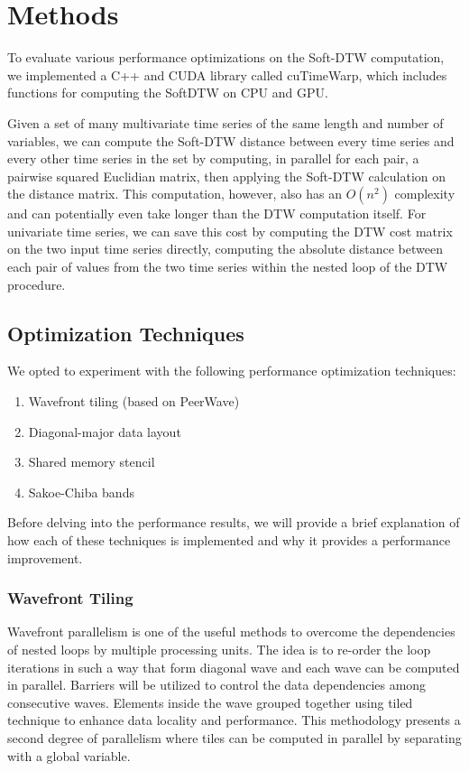 \documentclass[12pt, letterpaper]{article}
\begin{document}
\section{Methods}

To evaluate various performance optimizations on the Soft-DTW computation, we
implemented a C++ and CUDA library called cuTimeWarp, which includes functions
for computing the SoftDTW on CPU and GPU.

Given a set of many multivariate time series of the same length and number of
variables, we can compute the Soft-DTW distance between every time series and
every other time series in the set by computing, in parallel for each pair, a
pairwise squared Euclidian matrix, then applying the Soft-DTW calculation on the
distance matrix. This computation, however, also has an $O(n^2)$ complexity and
can potentially even take longer than the DTW computation itself. For univariate
time series, we can save this cost by computing the DTW cost matrix on the two
input time series directly, computing the absolute distance between each pair of
values from the two time series within the nested loop of the DTW procedure.

\subsection{Optimization Techniques}

We opted to experiment with the following performance optimization techniques:

\begin{enumerate}
\item Wavefront tiling (based on PeerWave)
\item Diagonal-major data layout
\item Shared memory stencil
\item Sakoe-Chiba bands
\end{enumerate}

Before delving into the performance results, we will provide a brief explanation
of how each of these techniques is implemented and why it provides a performance
improvement.

\subsubsection{Wavefront Tiling}
Wavefront parallelism is one of the useful methods to overcome the dependencies
of nested loops by multiple processing units. The idea is to re-order the loop
iterations in such a way that form diagonal wave and each wave can be computed
in parallel. Barriers will be utilized to control the data dependencies among
consecutive waves. Elements inside the wave grouped together using tiled
technique to enhance data locality and performance. This methodology presents a
second degree of parallelism where tiles can be computed in parallel by
separating with a global variable.
\end{document}
